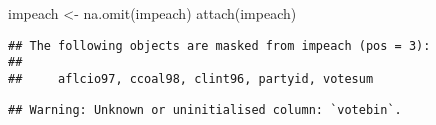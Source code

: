 \documentclass[
]{article}
\newenvironment{Shaded}{\begin{snugshade}}{\end{snugshade}}
\newcommand{\CommentTok}[1]{\textcolor[rgb]{0.56,0.35,0.01}{\textit{#1}}}
\newcommand{\DecValTok}[1]{\textcolor[rgb]{0.00,0.00,0.81}{#1}}
\newcommand{\FunctionTok}[1]{\textcolor[rgb]{0.00,0.00,0.00}{#1}}
\newcommand{\NormalTok}[1]{#1}
\newcommand{\OtherTok}[1]{\textcolor[rgb]{0.56,0.35,0.01}{#1}}
\newcommand{\SpecialCharTok}[1]{\textcolor[rgb]{0.00,0.00,0.00}{#1}}
\begin{document}
\begin{Shaded}
\begin{Highlighting}[]
\NormalTok{impeach }\OtherTok{\textless{}{-}} \FunctionTok{na.omit}\NormalTok{(impeach)}
\FunctionTok{attach}\NormalTok{(impeach)}
\end{Highlighting}
\end{Shaded}

\begin{verbatim}
## The following objects are masked from impeach (pos = 3):
## 
##     aflcio97, ccoal98, clint96, partyid, votesum
\end{verbatim}

\begin{Shaded}
\end{Shaded}

\begin{verbatim}
## Warning: Unknown or uninitialised column: `votebin`.
\end{verbatim}
\end{document}
